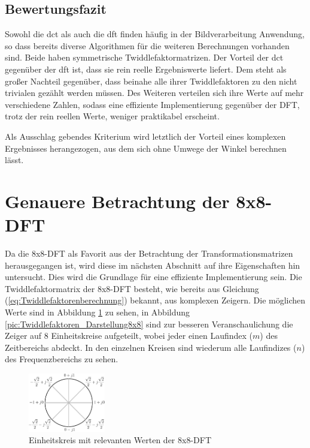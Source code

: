  
 \subsection{Bewertungsfazit}
 Sowohl die \gls{dct} als auch die \gls{dft} finden häufig in der Bildverarbeitung Anwendung, so dass bereits diverse Algorithmen für die weiteren
 Berechnungen vorhanden sind. Beide haben symmetrische Twiddlefaktormatrizen.
 Der Vorteil der \gls{dct} gegenüber der \gls{dft} ist, dass sie rein reelle Ergebniswerte liefert. 
 Dem steht als großer Nachteil gegenüber, dass beinahe alle ihrer Twiddlefaktoren zu den nicht trivialen gezählt werden müssen. 
 Des Weiteren verteilen sich ihre Werte auf mehr verschiedene Zahlen, sodass eine effiziente Implementierung gegenüber der DFT, trotz der rein reellen
 Werte, weniger praktikabel erscheint.
 
 Als Ausschlag gebendes Kriterium wird letztlich der Vorteil eines komplexen Ergebnisses herangezogen, aus dem sich ohne Umwege der Winkel berechnen lässt.

 

 
 
 \section{Genauere Betrachtung der 8x8-DFT}
 Da die 8x8-DFT als Favorit aus der Betrachtung der Transformationsmatrizen herausgegangen ist, wird diese im nächsten Abschnitt auf ihre Eigenschaften
 hin untersucht. Dies wird die Grundlage für eine effiziente Implementierung sein. 
 Die Twiddlefaktormatrix der 8x8-DFT besteht, wie bereits aus Gleichung (\ref{eq:Twiddlefaktorenberechnung}) bekannt, aus komplexen Zeigern.
 Die möglichen Werte sind in Abbildung \ref{pic:Einheitskreis_Faktoren} zu sehen, 
 in Abbildung \ref{pic:Twiddlefaktoren_Darstellung8x8} sind zur besseren Veranschaulichung die Zeiger auf 8 Einheitskreise aufgeteilt,
 wobei jeder einen Laufindex ($m$) des Zeitbereichs abdeckt. In den einzelnen Kreisen sind wiederum alle Laufindizes ($n$) des Frequenzbereichs zu sehen.
 
  \begin{figure}[!h]
  \centering
  \includegraphics[width=0.3\textwidth]{img/Einheitskreis-crop.pdf}
  \caption{Einheitskreis mit relevanten Werten der 8x8-DFT}
  \label{pic:Einheitskreis_Faktoren}
\end{figure}
  
